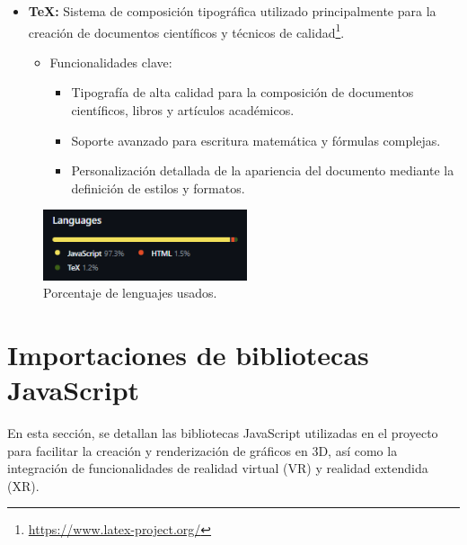 \documentclass[a4paper, 12pt]{book}
\begin{document}
\begin{itemize}
  \item \textbf{TeX:} Sistema de composición tipográfica utilizado principalmente para la creación de documentos científicos y técnicos de calidad\footnote{\url{https://www.latex-project.org/}}.
    \begin{itemize}
        \item Funcionalidades clave:
        \begin{itemize}
            \item Tipografía de alta calidad para la composición de documentos científicos, libros y artículos académicos.
            \item Soporte avanzado para escritura matemática y fórmulas complejas.
            \item Personalización detallada de la apariencia del documento mediante la definición de estilos y formatos.
        \end{itemize}
    \end{itemize}
\end{itemize}

\begin{figure}
  \centering
  \includegraphics[width=6cm, keepaspectratio]{img/lenguajes.png}
  \caption{Porcentaje de lenguajes usados.}
  \label{fig:lenguajes}
\end{figure}


\section{Importaciones de bibliotecas JavaScript} 
\label{sec:importaciones}

En esta sección, se detallan las bibliotecas JavaScript utilizadas en el proyecto para facilitar la creación y renderización de gráficos en 3D, 
así como la integración de funcionalidades de realidad virtual (VR) y realidad extendida (XR).
\end{document}
